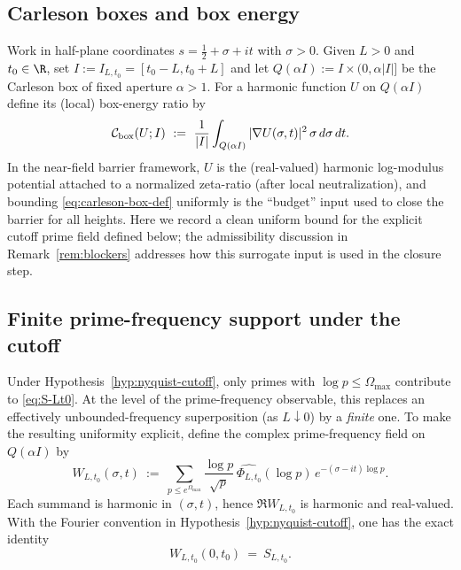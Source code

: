 \documentclass[11pt]{article}
\begin{document}
\subsection*{Carleson boxes and box energy}
Work in half-plane coordinates $s=\tfrac12+\sigma+it$ with $\sigma>0$.
Given $L>0$ and $t_0\in\R$, set $I:=I_{L,t_0}=[t_0-L,t_0+L]$ and let $Q(\alpha I):=I\times(0,\alpha|I|]$ be the Carleson box of fixed aperture $\alpha>1$.
For a harmonic function $U$ on $Q(\alpha I)$ define its (local) box-energy ratio by
\begin{equation}\label{eq:carleson-box-def}
  \mathcal C_{\rm box}(U;I)\ :=\ \frac{1}{|I|}\int_{Q(\alpha I)} |\nabla U(\sigma,t)|^2\,\sigma\,d\sigma\,dt.
\end{equation}
In the near-field barrier framework, $U$ is the (real-valued) harmonic log-modulus potential attached to a normalized zeta-ratio (after local neutralization), and bounding \eqref{eq:carleson-box-def} uniformly is the ``budget'' input used to close the barrier for all heights.
Here we record a clean uniform bound for the explicit cutoff prime field defined below; the admissibility discussion in Remark~\ref{rem:blockers} addresses how this surrogate input is used in the closure step.

\subsection*{Finite prime-frequency support under the cutoff}
Under Hypothesis~\ref{hyp:nyquist-cutoff}, only primes with $\log p\le \Omega_{\max}$ contribute to \eqref{eq:S-Lt0}.
At the level of the prime-frequency observable, this replaces an effectively unbounded-frequency superposition (as $L\downarrow 0$) by a \emph{finite} one.
To make the resulting uniformity explicit, define the complex prime-frequency field on $Q(\alpha I)$ by
\begin{equation}\label{eq:prime-field}
  W_{L,t_0}(\sigma,t)\ :=\ \sum_{p\le e^{\Omega_{\max}}}
  \frac{\log p}{\sqrt{p}}\,
  \widehat{\Phi_{L,t_0}}(\log p)\,
  e^{-(\sigma-i t)\log p}.
\end{equation}
Each summand is harmonic in $(\sigma,t)$, hence $\Re W_{L,t_0}$ is harmonic and real-valued.
With the Fourier convention in Hypothesis~\ref{hyp:nyquist-cutoff}, one has the exact identity
\[
  W_{L,t_0}(0,t_0)\ =\ S_{L,t_0}.
\]
\end{document}
